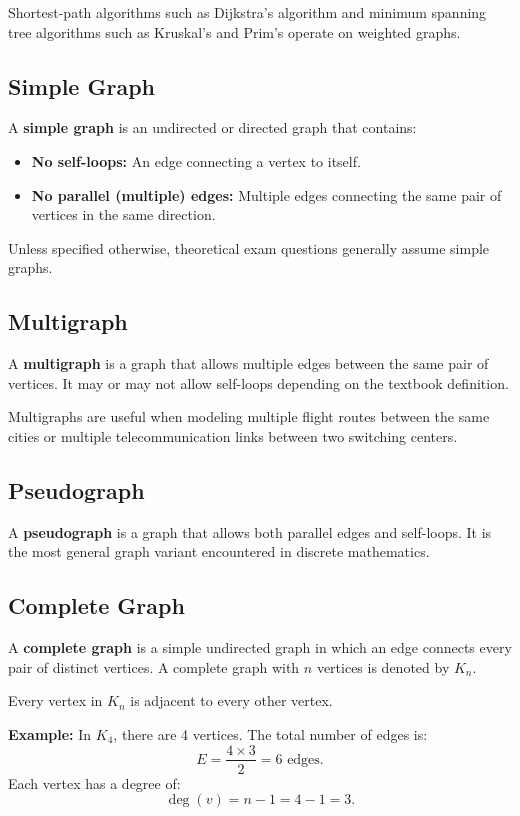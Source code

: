 Shortest-path algorithms such as Dijkstra's algorithm and minimum spanning tree algorithms such as Kruskal's and Prim's operate on weighted graphs.

\subsection{Simple Graph}
A \textbf{simple graph} is an undirected or directed graph that contains:
\begin{itemize}
    \item \textbf{No self-loops:} An edge connecting a vertex to itself.
    \item \textbf{No parallel (multiple) edges:} Multiple edges connecting the same pair of vertices in the same direction.
\end{itemize}
Unless specified otherwise, theoretical exam questions generally assume simple graphs.

\subsection{Multigraph}
A \textbf{multigraph} is a graph that allows multiple edges between the same pair of vertices. It may or may not allow self-loops depending on the textbook definition.

Multigraphs are useful when modeling multiple flight routes between the same cities or multiple telecommunication links between two switching centers.

\subsection{Pseudograph}
A \textbf{pseudograph} is a graph that allows both parallel edges and self-loops. It is the most general graph variant encountered in discrete mathematics.

\subsection{Complete Graph}
A \textbf{complete graph} is a simple undirected graph in which an edge connects every pair of distinct vertices. A complete graph with $n$ vertices is denoted by $K_n$.

Every vertex in $K_n$ is adjacent to every other vertex.

\textbf{Example:} In $K_4$, there are 4 vertices. The total number of edges is:
\[
E = \frac{4 \times 3}{2} = 6 \text{ edges.}
\]
Each vertex has a degree of:
\[
\deg(v) = n - 1 = 4 - 1 = 3.
\]

